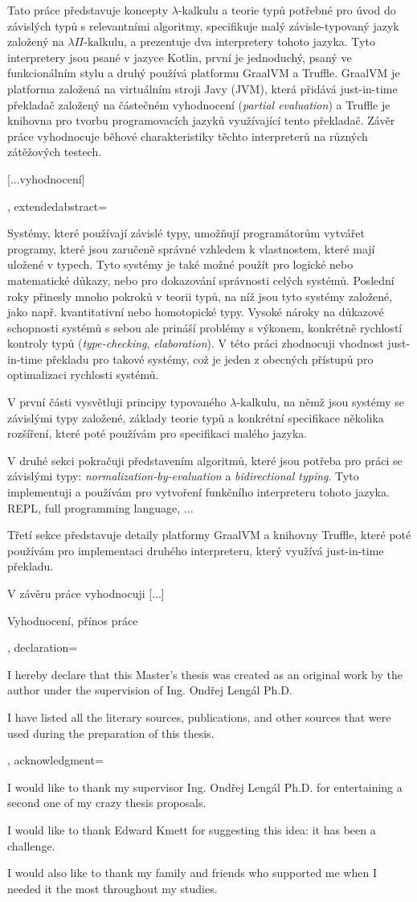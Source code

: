{{Tato práce představuje koncepty $\lambda\text{-kalkulu}$ a teorie typů potřebné
pro úvod do závislých typů s relevantními algoritmy, specifikuje malý
závisle-typovaný jazyk založený na $\lambda\Pi\text{-kalkulu}$, a prezentuje dva
interpretery tohoto jazyka. Tyto interpretery jsou psané v jazyce Kotlin, první
je jednoduchý, psaný ve funkcionálním stylu a druhý používá platformu GraalVM a
Truffle. GraalVM je platforma založená na virtuálním stroji Javy (JVM), která
přidává just-in-time překladač založený na částečném vyhodnocení
(\textit{partial evaluation}) a Truffle je knihovna pro tvorbu programovacích
jazyků využívající tento překladač. Závěr práce vyhodnocuje běhové
charakteristiky těchto interpreterů na různých zátěžových testech.

   [...vyhodnocení]
  },
  extendedabstract={
  Systémy, které používají závislé typy, umožňují programátorům vytvářet
  programy, které jsou zaručeně správné vzhledem k vlastnostem, které mají
  uložené v typech. Tyto systémy je také možné použít pro logické nebo
  matematické důkazy, nebo pro dokazování správnosti celých systémů.  Poslední
  roky přinesly mnoho pokroků v teorii typů, na níž jsou tyto systémy založené,
  jako např. kvantitativní nebo homotopické typy. Vysoké nároky na důkazové schopnosti
  systémů s sebou ale prináší problémy s výkonem, konkrétně rychlostí kontroly
  typů (\textit{type-checking}, \textit{elaboration}). V této práci zhodnocuji
  vhodnost just-in-time překladu pro takové systémy, což je jeden z obecných
  přístupů pro optimalizaci rychlosti systémů.

  V první části vysvětluji principy typovaného $\lambda\text{-kalkulu}$, na němž
  jsou systémy se závislými typy založené, základy teorie typů a konkrétní
  specifikace několika rozšíření, které poté používám pro specifikaci malého
  jazyka.

  V druhé sekci pokračuji představením algoritmů, které jsou potřeba pro práci
  se závislými typy: \textit{normalization-by-evaluation} a
  \textit{bidirectional typing}. Tyto implementuji a používám pro vytvoření
  funkčního interpreteru tohoto jazyka.
REPL, full programming language, ...

  Třetí sekce představuje detaily platformy GraalVM a knihovny Truffle, které
  poté používám pro implementaci druhého interpreteru, který využívá
  just-in-time překladu.

  V závěru práce vyhodnocuji [...]

  Vyhodnocení, přínos práce
  },
  declaration={
    I hereby declare that this Master's thesis was created as an original work
    by the author under the supervision of Ing. Ondřej Lengál Ph.D.

    I have listed all the literary sources, publications, and other sources
    that were used during the preparation of this thesis.
  },
  acknowledgment={
    I would like to thank my supervisor Ing. Ondřej Lengál Ph.D. for entertaining a
    second one of my crazy thesis proposals.

    I would like to thank Edward Kmett for suggesting this idea: it has been a
    challenge.

    I would also like to thank my family and friends who supported me when I needed
    it the most throughout my studies.
  }
}
